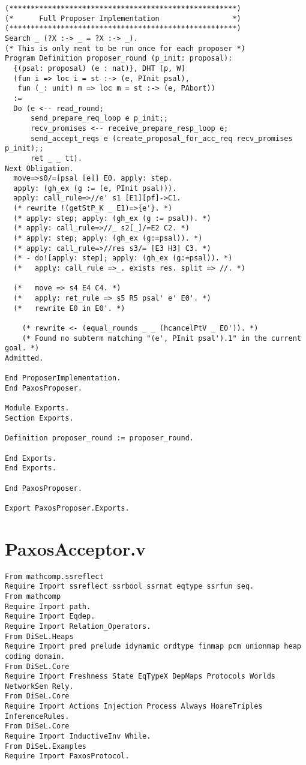 \begin{landscape}
\begin{multicols*}{2}
\begin{lstlisting}[style=SourceCodeListing]
(*****************************************************)
(*      Full Proposer Implementation                 *)
(*****************************************************)
Search _ (?X :-> _ = ?X :-> _).
(* This is only ment to be run once for each proposer *)
Program Definition proposer_round (p_init: proposal):
  {(psal: proposal) (e : nat)}, DHT [p, W]
  (fun i => loc i = st :-> (e, PInit psal),
   fun (_: unit) m => loc m = st :-> (e, PAbort))
  :=
  Do (e <-- read_round;
      send_prepare_req_loop e p_init;;
      recv_promises <-- receive_prepare_resp_loop e;
      send_accept_reqs e (create_proposal_for_acc_req recv_promises p_init);;
      ret _ _ tt).
Next Obligation.
  move=>s0/=[psal [e]] E0. apply: step.
  apply: (gh_ex (g := (e, PInit psal))).
  apply: call_rule=>//e' s1 [E1][pf]->C1.
  (* rewrite !(getStP_K _ E1)=>{e'}. *)
  (* apply: step; apply: (gh_ex (g := psal)). *)
  (* apply: call_rule=>//_ s2[_]/=E2 C2. *)
  (* apply: step; apply: (gh_ex (g:=psal)). *)
  (* apply: call_rule=>//res s3/= [E3 H3] C3. *)
  (* - do![apply: step]; apply: (gh_ex (g:=psal)). *)
  (*   apply: call_rule =>_. exists res. split => //. *)

  (*   move => s4 E4 C4. *)
  (*   apply: ret_rule => s5 R5 psal' e' E0'. *)
  (*   rewrite E0 in E0'. *)

    (* rewrite <- (equal_rounds _ _ (hcancelPtV _ E0')). *)
    (* Found no subterm matching "(e', PInit psal').1" in the current goal. *)
Admitted.

End ProposerImplementation.
End PaxosProposer.

Module Exports.
Section Exports.

Definition proposer_round := proposer_round.

End Exports.
End Exports.

End PaxosProposer.

Export PaxosProposer.Exports.
\end{lstlisting}
\end{multicols*}

\newpage

\section{PaxosAcceptor.v}
\begin{multicols*}{2}
\begin{lstlisting}[style=SourceCodeListing]
From mathcomp.ssreflect
Require Import ssreflect ssrbool ssrnat eqtype ssrfun seq.
From mathcomp
Require Import path.
Require Import Eqdep.
Require Import Relation_Operators.
From DiSeL.Heaps
Require Import pred prelude idynamic ordtype finmap pcm unionmap heap coding domain.
From DiSeL.Core
Require Import Freshness State EqTypeX DepMaps Protocols Worlds NetworkSem Rely.
From DiSeL.Core
Require Import Actions Injection Process Always HoareTriples InferenceRules.
From DiSeL.Core
Require Import InductiveInv While.
From DiSeL.Examples
Require Import PaxosProtocol.



\end{lstlisting}
\end{multicols*}
\end{landscape}

